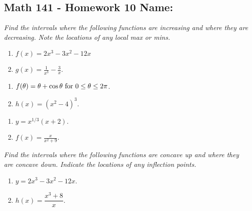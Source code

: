 \documentclass[11pt]{article}
\begin{document}
\pagestyle{empty}
\subsection*{Math 141 - Homework 10 \hfill Name: \underline{\hspace*{2in}}}



\textit{Find the intervals where the following functions are increasing and where they are decreasing. Note the locations of any local max or mins.}
\noindent
\begin{multicols}{2}
\begin{enumerate}
\item $f(x) = 2x^3 - 3x^2 - 12x$
\item $g(x) = \displaystyle \frac{1}{x^3} - \frac{3}{x}$.
\setcounter{enumCount}{\theenumi}
\end{enumerate}
\end{multicols}
\vfill


\begin{multicols}{2}
\begin{enumerate}
\setcounter{enumi}{\theenumCount}
\item $f(\theta) = \theta + \cos \theta\) for \(0 \le \theta \le 2\pi$.
\item $h(x) = (x^2-4)^3$.
\setcounter{enumCount}{\theenumi}
\end{enumerate}
\end{multicols}
\vfill

\begin{multicols}{2}
\begin{enumerate}
\setcounter{enumi}{\theenumCount}
\item $y = x^{1/3}(x+2)$.
\item $f(x) = \displaystyle \frac{x}{x^2+9}$.
\setcounter{enumCount}{\theenumi}
\end{enumerate}
\end{multicols}
\vfill

\noindent
\textit{Find the intervals where the following functions are concave up and where they are concave down. Indicate the locations of any inflection points.}
\begin{multicols}{2}
\begin{enumerate}
\setcounter{enumi}{\theenumCount}
\item $y = 2x^3 - 3x^2 - 12x$.
\item $h(x) = \dfrac{x^3+8}{x}$.
\setcounter{enumCount}{\theenumi}
\end{enumerate}
\end{multicols}
\vfill
\end{document}
